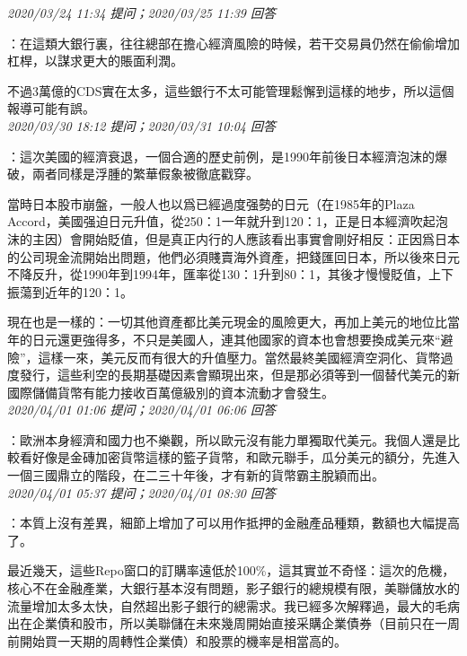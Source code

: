 \documentclass[twocolumn]{ctexart}
\begin{document}
\textit{\hfill\noindent\small 2020/03/24 11:34 提问；2020/03/25 11:39 回答}

：在這類大銀行裏，往往總部在擔心經濟風險的時候，若干交易員仍然在偷偷增加杠桿，以謀求更大的賬面利潤。

不過3萬億的CDS實在太多，這些銀行不太可能管理鬆懈到這樣的地步，所以這個報導可能有誤。
\\

\textit{\hfill\noindent\small 2020/03/30 18:12 提问；2020/03/31 10:04 回答}

：這次美國的經濟衰退，一個合適的歷史前例，是1990年前後日本經濟泡沫的爆破，兩者同樣是浮腫的繁華假象被徹底戳穿。

當時日本股市崩盤，一般人也以爲已經過度强勢的日元（在1985年的Plaza Accord，美國强迫日元升值，從250：1一年就升到120：1，正是日本經濟吹起泡沫的主因）會開始貶值，但是真正内行的人應該看出事實會剛好相反：正因爲日本的公司現金流開始出問題，他們必須賤賣海外資產，把錢匯回日本，所以後來日元不降反升，從1990年到1994年，匯率從130：1升到80：1，其後才慢慢貶值，上下振蕩到近年的120：1。

現在也是一樣的：一切其他資產都比美元現金的風險更大，再加上美元的地位比當年的日元還更強得多，不只是美國人，連其他國家的資本也會想要換成美元來“避險”，這樣一來，美元反而有很大的升值壓力。當然最終美國經濟空洞化、貨幣過度發行，這些利空的長期基礎因素會顯現出來，但是那必須等到一個替代美元的新國際儲備貨幣有能力接收百萬億級別的資本流動才會發生。
\\

\textit{\hfill\noindent\small 2020/04/01 01:06 提问；2020/04/01 06:06 回答}

：歐洲本身經濟和國力也不樂觀，所以歐元沒有能力單獨取代美元。我個人還是比較看好像是金磚加密貨幣這樣的籃子貨幣，和歐元聯手，瓜分美元的額分，先進入一個三國鼎立的階段，在二三十年後，才有新的貨幣霸主脫穎而出。
\\

\textit{\hfill\noindent\small 2020/04/01 05:37 提问；2020/04/01 08:30 回答}

：本質上沒有差異，細節上增加了可以用作抵押的金融產品種類，數額也大幅提高了。

最近幾天，這些Repo窗口的訂購率遠低於100\%，這其實並不奇怪：這次的危機，核心不在金融產業，大銀行基本沒有問題，影子銀行的總規模有限，美聯儲放水的流量增加太多太快，自然超出影子銀行的總需求。我已經多次解釋過，最大的毛病出在企業債和股市，所以美聯儲在未來幾周開始直接采購企業債券（目前只在一周前開始買一天期的周轉性企業債）和股票的機率是相當高的。
\end{document}
